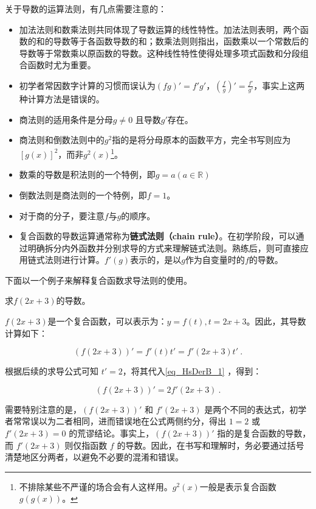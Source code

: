 关于导数的运算法则，有几点需要注意的：
\begin{itemize}
\item 加法法则和数乘法则共同体现了导数运算的线性特性。加法法则表明，两个函数的和的导数等于各函数导数的和；数乘法则则指出，函数乘以一个常数后的导数等于常数乘以原函数的导数。这种线性特性使得处理多项式函数和分段组合函数时尤为重要。
\item 初学者常因数字计算的习惯而误认为$(f  g)'= f' g'$，$\displaystyle\left(\frac{f}{g}\right)'=\frac{f'}{g'}$，事实上这两种计算方法是错误的。
\item 商法则的适用条件是分母$g\neq0$ 且导数$g'$存在。
\item 商法则和倒数法则中的$g^2$指的是将分母原本的函数平方，完全书写则应为$[g(x)]^2$，而非$g^2(x)$\footnote{不排除某些不严谨的场合会有人这样用。$g^2(x)$一般是表示复合函数$g\left(g(x)\right)$。}。
\item 数乘的导数是积法则的一个特例，即$g=a(a\in\mathbb{R})$
\item 倒数法则是商法则的一个特例，即$f=1$。
\item 对于商的分子，要注意$f$与$g$的顺序。
\item 复合函数的导数运算通常称为\textbf{链式法则（chain rule）}。在初学阶段，可以通过明确拆分内外函数并分别求导的方式来理解链式法则。熟练后，则可直接应用链式法则进行计算。$f'(g)$表示的，是以$g$作为自变量时的$f$的导数。
\end{itemize}

下面以一个例子来解释复合函数求导法则的使用。

\begin{example}{求$f(2x+3)$的导数。}

$f(2x+3)$是一个复合函数，可以表示为：$y = f(t) , t = 2x+3$。因此，其导数计算如下：

\begin{equation}\label{eq_HsDerB_1}
\left(f(2x+3)\right)' = f'(t)  t' = f'(2x+3)  t'~.
\end{equation}

根据后续的求导公式可知 $t' = 2$，将其代入\autoref{eq_HsDerB_1} ，得到：

\begin{equation}\label{eq_HsDerB_2}
\left(f(2x+3)\right)' = 2f'(2x+3)~.
\end{equation}

需要特别注意的是，$\left(f(2x+3)\right)'$ 和 $f'(2x+3)$ 是两个不同的表达式，初学者常常误以为二者相同，进而错误地在公式两侧约分，得出 $1 = 2$ 或 $f'(2x+3) = 0$ 的荒谬结论。事实上，$\left(f(2x+3)\right)'$ 指的是复合函数的导数，而 $f'(2x+3)$ 则仅指函数 $f$ 的导数。因此，在书写和理解时，务必要通过括号清楚地区分两者，以避免不必要的混淆和错误。
\end{example}


